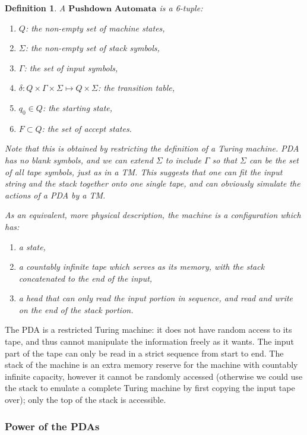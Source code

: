 \documentclass[12pt]{article}  %
\newtheorem{definition}{Definition}
\begin{document}
\begin{definition}
A $\textbf{Pushdown Automata}$ is a 6-tuple:
\begin{enumerate}
	\item $Q$: the non-empty set of machine states,
	\item $\Sigma$: the non-empty set of stack symbols,
	\item $\Gamma$: the set of input symbols,
	\item $\delta: Q \times \Gamma \times \Sigma \mapsto Q \times \Sigma $: the transition table,
	\item $q_0 \in Q$: the starting state,
	\item $F \subset Q$: the set of accept states.
\end{enumerate}

Note that this is obtained by restricting the definition of a Turing machine. PDA has no blank symbols, and we can extend $\Sigma$ to include $\Gamma$ so that $\Sigma$ can be the set of all tape symbols, just as in a TM. This suggests that one can fit the input string and the stack together onto one single tape, and can obviously  simulate the actions of a PDA by a TM.

As an equivalent, more physical description, the machine is a configuration which has:
\begin{enumerate}
	\item a state,
	\item a countably infinite tape which serves as its memory, with the stack concatenated to the end of the input,
	\item a head that can only read the input portion in sequence, and read and write on the end of the stack portion.
\end{enumerate}
\end{definition}



The PDA is a restricted Turing machine: it does not have random access to its tape, and thus cannot manipulate the information freely as it wants. The input part of the tape can only be read in a strict sequence from start to end. The stack of the machine is an extra memory reserve for the machine with countably infinite capacity, however it cannot be randomly accessed (otherwise we could use the stack to emulate a complete Turing machine by first copying the input tape over); only the top of the stack is accessible.




\subsubsection{Power of the PDAs}
\end{document}
